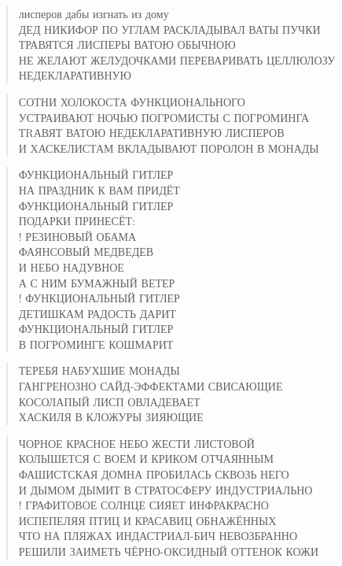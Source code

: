 \poemtitle{***}
\begin{verse}
лисперов дабы изгнать из дому\\
ДЕД НИКИФОР ПО УГЛАМ РАСКЛАДЫВАЛ ВАТЫ ПУЧКИ\\
ТРАВЯТСЯ ЛИСПЕРЫ ВАТОЮ ОБЫЧНОЮ\\
НЕ ЖЕЛАЮТ ЖЕЛУДОЧКАМИ ПЕРЕВАРИВАТЬ ЦЕЛЛЮЛОЗУ НЕДЕКЛАРАТИВНУЮ
\end{verse}

\poemtitle{***}
\begin{verse}
СОТНИ ХОЛОКОСТА ФУНКЦИОНАЛЬНОГО\\
УСТРАИВАЮТ НОЧЬЮ ПОГРОМИСТЫ С ПОГРОМИНГА\\
ТRАВЯТ ВАТОЮ НЕДЕКЛАРАТИВНУЮ ЛИСПЕРОВ\\
И ХАСКЕЛИСТАМ ВКЛАДЫВАЮТ ПОРОЛОН В МОНАДЫ
\end{verse}

\poemtitle{***}
\begin{verse}
ФУНКЦИОНАЛЬНЫЙ ГИТЛЕР\\
НА ПРАЗДНИК К ВАМ ПРИДЁТ\\
ФУНКЦИОНАЛЬНЫЙ ГИТЛЕР\\
ПОДАРКИ ПРИНЕСЁТ:\\!
РЕЗИНОВЫЙ ОБАМА\\
ФАЯНСОВЫЙ МЕДВЕДЕВ\\
И НЕБО НАДУВНОЕ\\
А С НИМ БУМАЖНЫЙ ВЕТЕР\\!
ФУНКЦИОНАЛЬНЫЙ ГИТЛЕР\\
ДЕТИШКАМ РАДОСТЬ ДАРИТ\\
ФУНКЦИОНАЛЬНЫЙ ГИТЛЕР\\
В ПОГРОМИНГЕ КОШМАРИТ
\end{verse}

\poemtitle{***}
\begin{verse}
ТЕРЕБЯ НАБУХШИЕ МОНАДЫ\\
ГАНГРЕНОЗНО САЙД-ЭФФЕКТАМИ СВИСАЮЩИЕ\\
КОСОЛАПЫЙ ЛИСП ОВЛАДЕВАЕТ\\
ХАСКИЛЯ В КЛОЖУРЫ ЗИЯЮЩИЕ
\end{verse}

\poemtitle{***}
\begin{verse}
ЧОРНОЕ КРАСНОЕ НЕБО ЖЕСТИ ЛИСТОВОЙ\\
КОЛЫШЕТСЯ С ВОЕМ И КРИКОМ ОТЧАЯННЫМ\\
ФАШИСТСКАЯ ДОМНА ПРОБИЛАСЬ СКВОЗЬ НЕГО\\
И ДЫМОМ ДЫМИТ В СТРАТОСФЕРУ ИНДУСТРИАЛЬНО\\!
ГРАФИТОВОЕ СОЛНЦЕ СИЯЕТ ИНФРАКРАСНО\\
ИСПЕПЕЛЯЯ ПТИЦ И КРАСАВИЦ ОБНАЖЁННЫХ\\
ЧТО НА ПЛЯЖАХ ИНДАСТРИАЛ-БИЧ НЕВОЗБРАННО\\
РЕШИЛИ ЗАИМЕТЬ ЧЁРНО-ОКСИДНЫЙ ОТТЕНОК КОЖИ
\end{verse}

